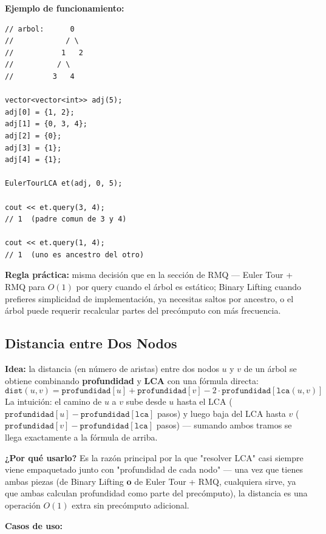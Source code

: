 \documentclass[10pt,a4paper,twocolumn]{article}
\begin{document}
\textbf{Ejemplo de funcionamiento:}

\begin{lstlisting}[style=cpp]
// arbol:      0
//            / \
//           1   2
//          / \
//         3   4

vector<vector<int>> adj(5);
adj[0] = {1, 2};
adj[1] = {0, 3, 4};
adj[2] = {0};
adj[3] = {1};
adj[4] = {1};

EulerTourLCA et(adj, 0, 5);

cout << et.query(3, 4);
// 1  (padre comun de 3 y 4)

cout << et.query(1, 4);
// 1  (uno es ancestro del otro)
\end{lstlisting}

\textbf{Regla práctica:} misma decisión que en la sección de RMQ —
Euler Tour + RMQ para $O(1)$ por query cuando el árbol es estático;
Binary Lifting cuando prefieres simplicidad de implementación, ya
necesitas saltos por ancestro, o el árbol puede requerir recalcular
partes del precómputo con más frecuencia.


\subsection{Distancia entre Dos Nodos}

\textbf{Idea:} la distancia (en número de aristas) entre dos nodos
$u$ y $v$ de un árbol se obtiene combinando \textbf{profundidad} y
\textbf{LCA} con una fórmula directa:
$$\texttt{dist}(u,v) = \texttt{profundidad}[u] + \texttt{profundidad}[v]
- 2 \cdot \texttt{profundidad}[\texttt{lca}(u,v)]$$
La intuición: el camino de $u$ a $v$ sube desde $u$ hasta el LCA
($\texttt{profundidad}[u] - \texttt{profundidad}[\texttt{lca}]$
pasos) y luego baja del LCA hasta $v$
($\texttt{profundidad}[v] - \texttt{profundidad}[\texttt{lca}]$
pasos) — sumando ambos tramos se llega exactamente a la fórmula de
arriba.

\textbf{¿Por qué usarlo?} Es la razón principal por la que "resolver
LCA" casi siempre viene empaquetado junto con "profundidad de cada
nodo" — una vez que tienes ambas piezas (de Binary Lifting \textbf{o}
de Euler Tour + RMQ, cualquiera sirve, ya que ambas calculan
profundidad como parte del precómputo), la distancia es una operación
$O(1)$ extra sin precómputo adicional.

\textbf{Casos de uso:}
\end{document}
